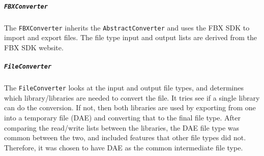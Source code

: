     \subparagraph{\texttt{FBXConverter}}
    \hfill \break
    The \texttt{FBXConverter} inherits the \texttt{AbstractConverter} and uses the FBX SDK to import and export files.
    The file type input and output lists are derived from the FBX SDK website.

    \subparagraph{\texttt{FileConverter}}
    \hfill \break
    The \texttt{FileConverter} looks at the input and output file types, and determines which library/libraries are needed to convert the file.
    It tries see if a single library can do the conversion.  If not, then both libraries are used by exporting from one into a 
    temporary file (DAE) and converting that to the final file type. After comparing the read/write lists between the libraries,
    the DAE file type was common between the two, and included features that other file types did not.  Therefore, it was chosen
    to have DAE as the common intermediate file type.
